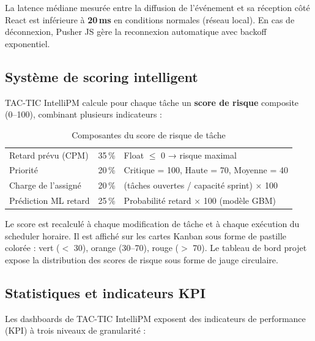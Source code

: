 La latence médiane mesurée entre la diffusion de l'événement et sa réception côté
React est inférieure à \textbf{20\,ms} en conditions normales (réseau local). En cas
de déconnexion, Pusher JS gère la reconnexion automatique avec backoff exponentiel.

\subsection{Système de scoring intelligent}

TAC-TIC IntelliPM calcule pour chaque tâche un \textbf{score de risque} composite
(0--100), combinant plusieurs indicateurs :

\begin{table}[H]
  \centering
  \caption{Composantes du score de risque de tâche}
  \label{tab:score_risque}
  \begin{tabularx}{\textwidth}{L{5cm}C{2cm}X}
    \toprule
     &  &  \\
    \midrule
    Retard prévu (CPM)     & 35\,\% & Float $\leq$ 0 → risque maximal \\
    Priorité               & 20\,\% & Critique = 100, Haute = 70, Moyenne = 40 \\
    Charge de l'assigné    & 20\,\% & (tâches ouvertes / capacité sprint) × 100 \\
    Prédiction ML retard   & 25\,\% & Probabilité retard × 100 (modèle GBM) \\
    \bottomrule
  \end{tabularx}
\end{table}

Le score est recalculé à chaque modification de tâche et à chaque exécution du
scheduler horaire. Il est affiché sur les cartes Kanban sous forme de pastille
colorée : vert ($<$ 30), orange (30--70), rouge ($>$ 70). Le tableau de bord projet
expose la distribution des scores de risque sous forme de jauge circulaire.

\subsection{Statistiques et indicateurs KPI}

Les dashboards de TAC-TIC IntelliPM exposent des indicateurs de performance (KPI)
à trois niveaux de granularité :

